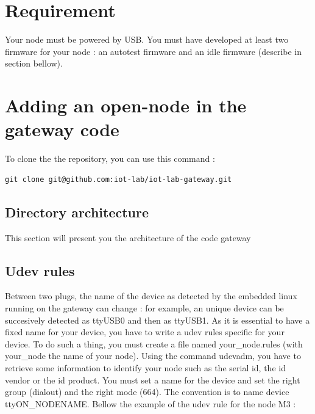 \documentclass[12pt,a4paper,twoside]{article}
\begin{document}
\section{Requirement}
Your node must be powered by USB.\newline
You must have developed at least two firmware for your node : an autotest firmware and an idle firmware (describe in section bellow).\newline
\section{Adding an open-node in the gateway code}
To clone the the repository, you can use this command :
\begin{verbatim}
git clone git@github.com:iot-lab/iot-lab-gateway.git
\end{verbatim}
\subsection{Directory architecture}
This section will present you the architecture of the code gateway
\medskip
{}
\subsection{Udev rules}
Between two plugs, the name of the device as detected by the embedded linux running on the gateway can change : for example, an unique device can be succesively detected as ttyUSB0 and then as ttyUSB1.\newline 
As it is essential to have a fixed name for your device, you have to write a udev rules specific for your device.\newline
To do such a thing, you must create a file named your\_node.rules (with your\_node the name of your node).\newline
Using the command udevadm, you have to retrieve some information to identify your node such as the serial id, the id vendor or the id product. You must set a name for the device and set the right group (dialout) and the right mode (664). The convention is to name device ttyON\_NODENAME. \newline
Bellow the example of the udev rule for the node M3 : 
\end{document}
